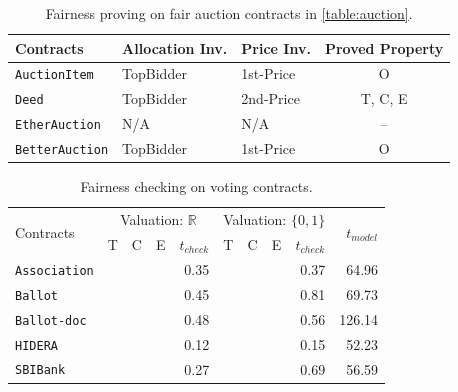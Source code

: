 \begin{table}[t]
	\caption{Fairness proving on fair auction contracts in \cref{table:auction}.}
	\label{table:proof}
	\small
	\begin{tabular}{lllc}
		\toprule
		\multirow{1}{*}{Contracts} & Allocation Inv. & Price Inv. & Proved Property \\
		\midrule
		\multirow{1}{*}{\texttt{AuctionItem}}  & TopBidder & 1st-Price & O \\
		\multirow{1}{*}{\texttt{Deed}}   &  TopBidder & 2nd-Price  & T, C, E \\
		\multirow{1}{*}{\texttt{EtherAuction}}  & N/A & N/A & -- \\
		\multirow{1}{*}{\texttt{BetterAuction}}  & TopBidder& 1st-Price & O \\
		\bottomrule
	\end{tabular}
\end{table}

\begin{table}[t]
	\caption{Fairness checking on voting contracts.}\label{table:voting}
	\small
	\begin{tabular}{lcccr|cccr|r}
		\toprule
		\multirow{2}{.5in}{Contracts} & \multicolumn{4}{c|}{Valuation: $\mathbb{R}$ } & \multicolumn{4}{c|}{Valuation: $\{0,1\}$} &
		\multirow{2}{.3in}{$t_{model}$}\\
		\cmidrule{2-9}
		& T & C & E & $t_{check}$ & T & C & E & $t_{check}$ & \\
		\midrule
		\texttt{Association} &\xmark  &\xmark &\xmark &  0.35  &\cmark  &\cmark &\cmark &0.37 &64.96\\
		\texttt{Ballot}      &\xmark  &\xmark &\xmark &  0.45  &\cmark  &\cmark &\cmark &0.81 &69.73\\
		\texttt{Ballot-doc}  &\xmark  &\xmark &\xmark &  0.48  &\cmark  &\cmark &\cmark &0.56 &126.14    \\
		\texttt{HIDERA}     &\xmark  &\xmark &\xmark &  0.12  &\cmark  &\cmark &\cmark &0.15 &52.23     \\
		\texttt{SBIBank}     &\xmark  &\xmark &\xmark &  0.27  &\cmark  &\cmark &\cmark &0.69 &56.59   \\
		\bottomrule
	\end{tabular}
\end{table}

